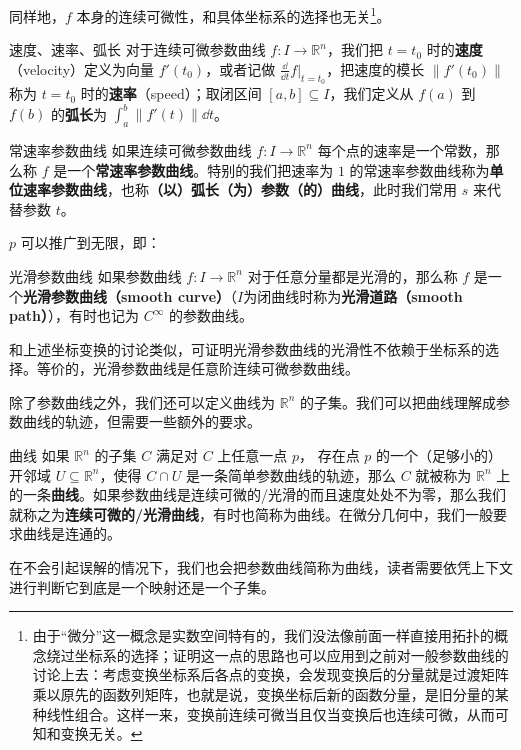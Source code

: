 同样地，$f$ 本身的连续可微性，和具体坐标系的选择也无关\footnote{由于“微分”这一概念是实数空间特有的，我们没法像前面一样直接用拓扑的概念绕过坐标系的选择；证明这一点的思路也可以应用到之前对一般参数曲线的讨论上去：考虑变换坐标系后各点的变换，会发现变换后的分量就是过渡矩阵乘以原先的函数列矩阵，也就是说，变换坐标后新的函数分量，是旧分量的某种线性组合。这样一来，变换前连续可微当且仅当变换后也连续可微，从而可知和变换无关。}。

\begin{definition}{速度、速率、弧长}
对于连续可微参数曲线 $f: I \to \mathbb{R}^n$，我们把 $t = t_0$ 时的\textbf{速度}（velocity）定义为向量 $f'(t_0)$，或者记做 $\frac{\dd}{\dd t} f |_{t = t_0}$，把速度的模长 $\|f'(t_0)\|$ 称为 $t = t_0$ 时的\textbf{速率}（speed）；取闭区间 $[a, b] \subseteq I$，我们定义从 $f(a)$ 到 $f(b)$ 的\textbf{弧长}为 $\int_a^b \|f'(t)\| \dd t$。
\end{definition}

\begin{definition}{常速率参数曲线}\label{eucur_def1}
如果连续可微参数曲线 $f: I \to \mathbb{R}^n$ 每个点的速率是一个常数，那么称 $f$ 是一个\textbf{常速率参数曲线}。特别的我们把速率为 $1$ 的常速率参数曲线称为\textbf{单位速率参数曲线}，也称\textbf{（以）弧长（为）参数（的）曲线}，此时我们常用 $s$ 来代替参数 $t$。
\end{definition}

$p$ 可以推广到无限，即：

\begin{definition}{光滑参数曲线}
如果参数曲线 $f: I \to \mathbb{R}^n$ 对于任意分量都是光滑的，那么称 $f$ 是一个\textbf{光滑参数曲线（smooth curve）}（$I$为闭曲线时称为\textbf{光滑道路（smooth path）}），有时也记为 $C^\infty$ 的参数曲线。
\end{definition}

和上述坐标变换的讨论类似，可证明光滑参数曲线的光滑性不依赖于坐标系的选择。等价的，光滑参数曲线是任意阶连续可微参数曲线。

除了参数曲线之外，我们还可以定义曲线为 $\mathbb{R}^n$ 的子集。我们可以把曲线理解成参数曲线的轨迹，但需要一些额外的要求。

\begin{definition}{曲线}
如果 $\mathbb{R}^n$ 的子集 $C$ 满足对 $C$ 上任意一点 $p$， 存在点 $p$ 的一个（足够小的）开邻域 $U \subseteq \mathbb{R}^n$，使得 $C \cap U$ 是一条简单参数曲线的轨迹，那么 $C$ 就被称为 $\mathbb{R}^n$ 上的一条\textbf{曲线}。如果参数曲线是连续可微的/光滑的而且速度处处不为零，那么我们就称之为\textbf{连续可微的/光滑曲线}，有时也简称为曲线。在微分几何中，我们一般要求曲线是连通的。
\end{definition}

在不会引起误解的情况下，我们也会把参数曲线简称为曲线，读者需要依凭上下文进行判断它到底是一个映射还是一个子集。

